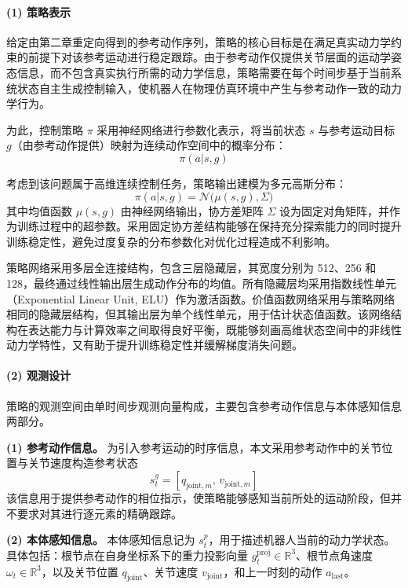 \paragraph{(1) 策略表示}

给定由第二章重定向得到的参考动作序列，策略的核心目标是在满足真实动力学约束的前提下对该参考运动进行稳定跟踪。由于参考动作仅提供关节层面的运动学姿态信息，而不包含真实执行所需的动力学信息，策略需要在每个时间步基于当前系统状态自主生成控制输入，使机器人在物理仿真环境中产生与参考动作一致的动力学行为。

为此，控制策略 $\pi$ 采用神经网络进行参数化表示，将当前状态 $s$ 与参考运动目标 $g$（由参考动作提供）映射为连续动作空间中的概率分布：
\begin{equation}
	\pi(a|s,g)
\end{equation}

考虑到该问题属于高维连续控制任务，策略输出建模为多元高斯分布：
\begin{equation}
	\pi(a|s,g)
	=
	\mathcal{N}\big(\mu(s,g), \Sigma\big)
\end{equation}
其中均值函数 $\mu(s,g)$ 由神经网络输出，协方差矩阵 $\Sigma$ 设为固定对角矩阵，并作为训练过程中的超参数。采用固定协方差结构能够在保持充分探索能力的同时提升训练稳定性，避免过度复杂的分布参数化对优化过程造成不利影响。

策略网络采用多层全连接结构，包含三层隐藏层，其宽度分别为 512、256 和 128，最终通过线性输出层生成动作分布的均值。所有隐藏层均采用指数线性单元（Exponential Linear Unit, ELU）作为激活函数。价值函数网络采用与策略网络相同的隐藏层结构，但其输出层为单个线性单元，用于估计状态值函数。该网络结构在表达能力与计算效率之间取得良好平衡，既能够刻画高维状态空间中的非线性动力学特性，又有助于提升训练稳定性并缓解梯度消失问题。

\paragraph{(2) 观测设计}

策略的观测空间由单时间步观测向量构成，主要包含参考动作信息与本体感知信息两部分。

\textbf{(1) 参考动作信息。}
为引入参考运动的时序信息，本文采用参考动作中的关节位置与关节速度构造参考状态
\begin{equation}
	s_t^g = [q_{\text{joint},m}, \, v_{\text{joint},m}]
\end{equation}
该信息用于提供参考动作的相位指示，使策略能够感知当前所处的运动阶段，但并不要求对其进行逐元素的精确跟踪。

\textbf{(2) 本体感知信息。}
本体感知信息记为 $s_t^p$，用于描述机器人当前的动力学状态。具体包括：根节点在自身坐标系下的重力投影向量 $g^{\text{proj}}_t \in \mathbb{R}^3$、根节点角速度 $\omega_t \in \mathbb{R}^3$，以及关节位置 $q_{\text{joint}}$、关节速度 $v_{\text{joint}}$，和上一时刻的动作 $a_{\text{last}}$。

